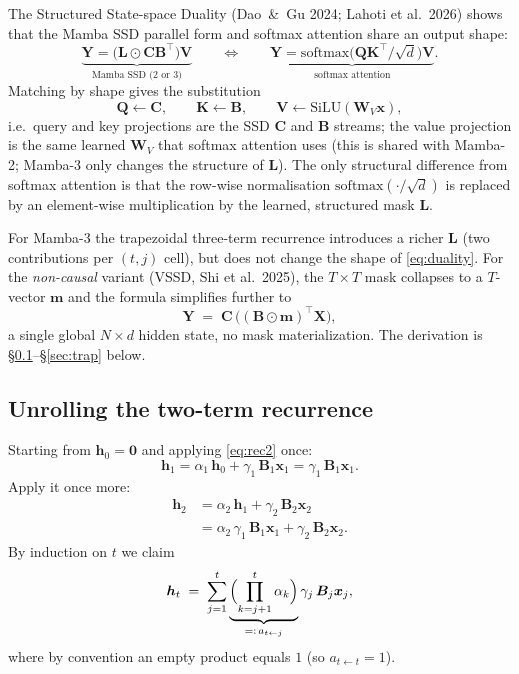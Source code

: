 \documentclass[11pt,a4paper]{article}
\begin{document}
The Structured State-space Duality (Dao~\&~Gu 2024; Lahoti et al.\
2026) shows that the Mamba SSD parallel form and softmax attention
share an output shape:
\begin{equation}\label{eq:duality}
  \underbrace{\bm{Y} = \bigl(\bm{L}\odot\bm{C}\bm{B}^\top\bigr)\bm{V}}_{\text{Mamba SSD (2 or 3)}}
  \qquad\Longleftrightarrow\qquad
  \underbrace{\bm{Y} = \mathrm{softmax}\!\bigl(\bm{Q}\bm{K}^\top/\sqrt{d}\bigr)\bm{V}}_{\text{softmax attention}}.
\end{equation}
Matching by shape gives the substitution
\[
  \bm{Q} \leftarrow \bm{C},\qquad
  \bm{K} \leftarrow \bm{B},\qquad
  \bm{V} \leftarrow \mathrm{SiLU}(\bm{W}_V\bm{x}),
\]
i.e.\ query and key projections are the SSD $\bm{C}$ and $\bm{B}$
streams; the value projection is the same learned $\bm{W}_V$ that
softmax attention uses (this is shared with Mamba-2; Mamba-3 only
changes the structure of $\bm{L}$). The only structural difference
from softmax attention is that the row-wise normalisation
$\mathrm{softmax}(\cdot/\sqrt{d})$ is replaced by an element-wise
multiplication by the learned, structured mask $\bm{L}$.

For Mamba-3 the trapezoidal three-term recurrence introduces a richer
$\bm{L}$ (two contributions per $(t,j)$ cell), but does not change the
shape of \eqref{eq:duality}. For the \emph{non-causal} variant
(VSSD, Shi et al.\ 2025), the $T\times T$ mask collapses to a
$T$-vector $\bm{m}$ and the formula simplifies further to
\begin{equation}\label{eq:vssd}
  \bm{Y} \;=\; \bm{C}\,\bigl((\bm{B}\odot\bm{m})^\top\bm{X}\bigr),
\end{equation}
a single global $N\times d$ hidden state, no mask materialization.
The derivation is \S\ref{sec:ssd-unroll}--\S\ref{sec:trap} below.

\subsection{Unrolling the two-term recurrence}
\label{sec:ssd-unroll}

Starting from $\bm{h}_0 = \bm{0}$ and applying \eqref{eq:rec2} once:
\begin{equation}\label{eq:un1}
  \bm{h}_1 = \alpha_1\,\bm{h}_0 + \gamma_1\,\bm{B}_1\bm{x}_1
           = \gamma_1\,\bm{B}_1\bm{x}_1.
\end{equation}
Apply it once more:
\begin{align}
  \bm{h}_2 &= \alpha_2\,\bm{h}_1 + \gamma_2\,\bm{B}_2\bm{x}_2 \nonumber \\
           &= \alpha_2\,\gamma_1\,\bm{B}_1\bm{x}_1
             + \gamma_2\,\bm{B}_2\bm{x}_2. \label{eq:un2}
\end{align}
By induction on $t$ we claim
\begin{equation}\label{eq:un-claim}
  \bm{h}_t \;=\; \sum_{j=1}^{t}
     \underbrace{\Bigl(\prod_{k=j+1}^{t}\alpha_k\Bigr)}_{=:\,a_{t\leftarrow j}}
     \gamma_j\,\bm{B}_j\bm{x}_j,
\end{equation}
where by convention an empty product equals $1$ (so
$a_{t\leftarrow t} = 1$).
\end{document}
